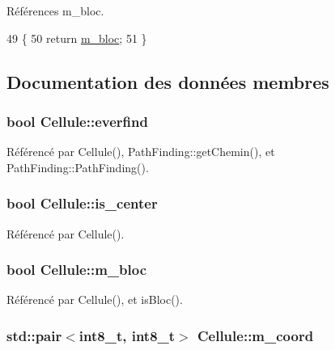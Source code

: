 Références m\-\_\-bloc.


\begin{DoxyCode}
49                      \{
50             \textcolor{keywordflow}{return} \hyperlink{classCellule_adf634a9bd573a298652d70a93f3e5c6e}{m\_bloc};
51         \}
\end{DoxyCode}


\subsection{Documentation des données membres}
\hypertarget{classCellule_a9c368e6fb89c5ea1e31b810207eca9ee}{
\subsubsection[{everfind}]{\setlength{\rightskip}{0pt plus 5cm}bool Cellule\-::everfind}}\label{classCellule_a9c368e6fb89c5ea1e31b810207eca9ee}


Référencé par Cellule(), Path\-Finding\-::get\-Chemin(), et Path\-Finding\-::\-Path\-Finding().

\hypertarget{classCellule_abd3eef3d41bf99ca3a1d9edc97aa8282}{
\subsubsection[{is\-\_\-center}]{\setlength{\rightskip}{0pt plus 5cm}bool Cellule\-::is\-\_\-center\hspace{0.3cm}{\ttfamily [private]}}}\label{classCellule_abd3eef3d41bf99ca3a1d9edc97aa8282}


Référencé par Cellule().

\hypertarget{classCellule_adf634a9bd573a298652d70a93f3e5c6e}{
\subsubsection[{m\-\_\-bloc}]{\setlength{\rightskip}{0pt plus 5cm}bool Cellule\-::m\-\_\-bloc\hspace{0.3cm}{\ttfamily [private]}}}\label{classCellule_adf634a9bd573a298652d70a93f3e5c6e}


Référencé par Cellule(), et is\-Bloc().

\hypertarget{classCellule_a9573d226e0df26453a67fb3730794444}{
\subsubsection[{m\-\_\-coord}]{\setlength{\rightskip}{0pt plus 5cm}std\-::pair$<$int8\-\_\-t, int8\-\_\-t$>$ Cellule\-::m\-\_\-coord\hspace{0.3cm}{\ttfamily [private]}}}\label{classCellule_a9573d226e0df26453a67fb3730794444}


